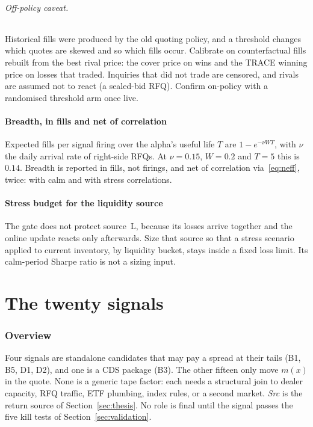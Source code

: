 \documentclass[11pt,letterpaper]{article}
\begin{document}
\paragraph{Off-policy caveat.} Historical fills were produced by the old quoting policy, and a threshold changes which quotes are skewed and so which fills occur. Calibrate on counterfactual fills rebuilt from the best rival price: the cover price on wins and the TRACE winning price on losses that traded. Inquiries that did not trade are censored, and rivals are assumed not to react (a sealed-bid RFQ). Confirm on-policy with a randomised threshold arm once live.

\subsection{Breadth, in fills and net of correlation}
Expected fills per signal firing over the alpha's useful life $T$ are $1-e^{-\nu W T}$, with $\nu$ the daily arrival rate of right-side RFQs. At $\nu=0.15$, $W=0.2$ and $T=5$ this is $0.14$. Breadth is reported in fills, not firings, and net of correlation via~\eqref{eq:neff}, twice: with calm and with stress correlations.

\subsection{Stress budget for the liquidity source}
The gate does not protect source~L, because its losses arrive together and the online update reacts only afterwards. Size that source so that a stress scenario applied to current inventory, by liquidity bucket, stays inside a fixed loss limit. Its calm-period Sharpe ratio is not a sizing input.
\part{The twenty signals}

\section{Overview}
\label{sec:overview}

Four signals are standalone candidates that may pay a spread at their tails (B1, B5, D1, D2), and one is a CDS package (B3). The other fifteen only move $m(x)$ in the quote. None is a generic tape factor: each needs a structural join to dealer capacity, RFQ traffic, ETF plumbing, index rules, or a second market. \emph{Src} is the return source of Section~\ref{sec:thesis}. No role is final until the signal passes the five kill tests of Section~\ref{sec:validation}.
\end{document}
